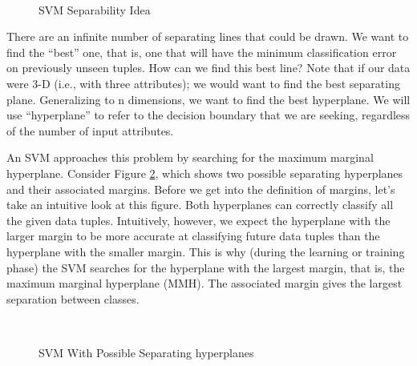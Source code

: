 \documentclass[12pt,fleqn]{book} %
\begin{document}
\begin{figure}[h]
\begin{dBox}
\centering
  \mbox{
   }
   \caption{SVM Separability Idea\label{fig:svm1} }   
\end{dBox}   
\end{figure}

There are an infinite number of separating lines that could be drawn. We want to find the “best” one, that is, one that will have the minimum classification error on previously unseen tuples. How can we find this best line? Note that if our data were 3-D (i.e., with three attributes); we would want to find the best separating plane. Generalizing to n dimensions, we want to find the best hyperplane. We will use “hyperplane” to refer to the decision boundary that we are seeking, regardless of the number of input attributes.\bigskip

An SVM approaches this problem by searching for the maximum marginal hyperplane. Consider Figure \ref{fig:svm2}, which shows two possible separating hyperplanes and their associated margins. Before we get into the definition of margins, let’s take an intuitive look at this figure. Both hyperplanes can correctly classify all the given data tuples. Intuitively, however, we expect the hyperplane with the larger margin to be more accurate at classifying future data tuples than the hyperplane with the smaller margin. This is why (during the learning or training phase) the SVM searches for the hyperplane with the largest margin, that is, the maximum marginal hyperplane (MMH). The associated margin gives the largest separation between classes.
\bigskip
\begin{figure}[h]
\begin{dBox}
\centering
  \mbox{
   }
   \caption{SVM With Possible Separating hyperplanes\label{fig:svm2} }   
\end{dBox}   
\end{figure}
\end{document}
